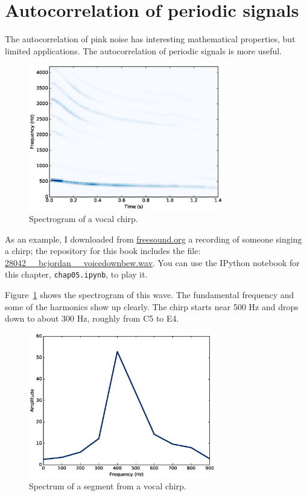 \documentclass[12pt]{book}
\begin{document}
\section{Autocorrelation of periodic signals}

The autocorrelation of pink noise has interesting mathematical
properties, but limited applications.  The autocorrelation of
periodic signals is more useful.

\begin{figure}
\centerline{\includegraphics[height=2.5in]{figs/autocorr5.eps}}
\caption{Spectrogram of a vocal chirp.}
\label{fig.autocorr5}
\end{figure}

As an example, I downloaded from \url{freesound.org} a recording of
someone singing a chirp; the repository for this book includes the
file: \url{28042__bcjordan__voicedownbew.wav}.  You can use the
IPython notebook for this chapter, {\tt chap05.ipynb}, to play it.

Figure~\ref{fig.autocorr5} shows the spectrogram of this wave.
The fundamental frequency and some of the harmonics show up clearly.
The chirp starts near 500 Hz and drops down to about 300 Hz, roughly
from C5 to E4.

\begin{figure}
\centerline{\includegraphics[height=2.5in]{figs/autocorr6.eps}}
\caption{Spectrum of a segment from a vocal chirp.}
\label{fig.autocorr6}
\end{figure}
\end{document}
